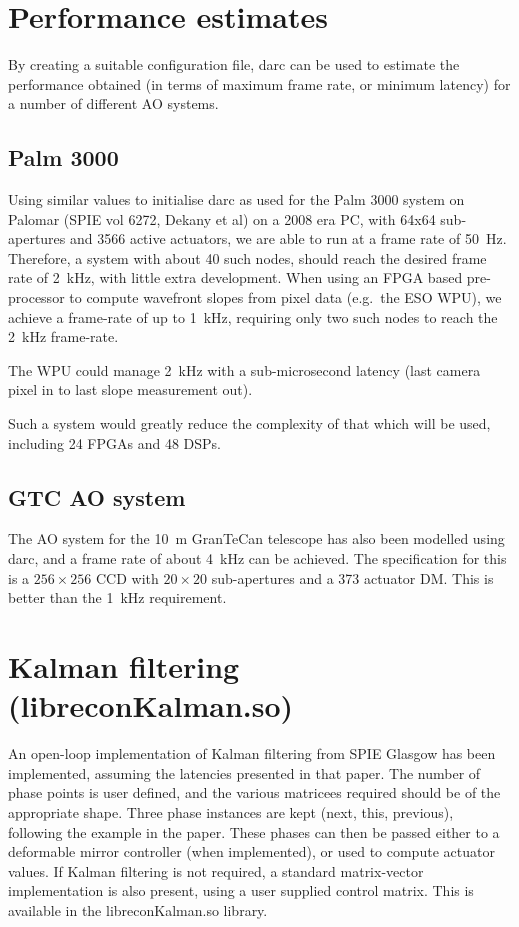 \documentclass[a4,10pt]{article}
\begin{document}
\section{Performance estimates}
By creating a suitable configuration file, darc can be used to
estimate the performance obtained (in terms of maximum frame rate, or
minimum latency) for a number of different AO systems.

\subsection{Palm 3000}
Using similar values to initialise darc as used for the Palm 3000
system on Palomar (SPIE vol 6272, Dekany et al) on a 2008 era PC,
with 64x64 sub-apertures and 3566 active actuators, we are able to run
at a frame rate of 50~Hz.  Therefore, a system with about 40 such
nodes, should reach the desired frame rate of 2~kHz, with little extra
development.  When using an FPGA based pre-processor to compute
wavefront slopes from pixel data (e.g.\ the ESO WPU), we achieve a
frame-rate of up to 1~kHz, requiring only two such nodes to reach the
2~kHz frame-rate.

The WPU could manage 2~kHz with a sub-microsecond latency (last camera
pixel in to last slope measurement out).

Such a system would greatly reduce the complexity of that which will
be used, including 24 FPGAs and 48 DSPs.

\subsection{GTC AO system}
The AO system for the 10~m GranTeCan telescope has also been modelled
using darc, and a frame rate of about 4~kHz can be achieved.  The
specification for this is a $256\times256$ CCD with $20\times20$
sub-apertures and a 373 actuator DM.  This is better than the 1~kHz
requirement.



\section{Kalman filtering (libreconKalman.so)}
\label{sect:kalman}
An open-loop implementation of Kalman filtering from SPIE Glasgow has
been implemented, assuming the latencies presented in that paper.  The
number of phase points is user defined, and the various matricees
required should be of the appropriate shape.  Three phase instances
are kept (next, this, previous), following the example in the paper.
These phases can then be passed either to a deformable mirror
controller (when implemented), or used to compute actuator values.  If
Kalman filtering is not required, a standard matrix-vector
implementation is also present, using a user supplied control matrix.
This is available in the libreconKalman.so library.
\end{document}
